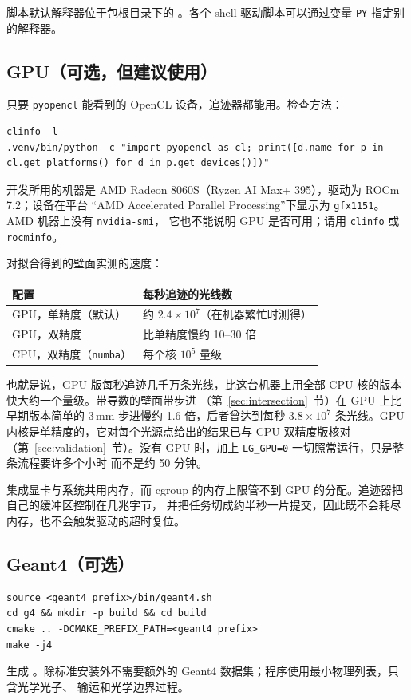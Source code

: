 \documentclass[11pt,a4paper,fontset=fandol]{ctexart}
\newcommand{\code}[1]{\texttt{#1}}
\begin{document}
脚本默认解释器位于包根目录下的 。各个 shell 驱动脚本可以通过变量 \code{PY}
指定别的解释器。

\subsection{GPU（可选，但建议使用）}

只要 \code{pyopencl} 能看到的 OpenCL 设备，追迹器都能用。检查方法：
\begin{lstlisting}
clinfo -l
.venv/bin/python -c "import pyopencl as cl; print([d.name for p in cl.get_platforms() for d in p.get_devices()])"
\end{lstlisting}
开发所用的机器是 AMD Radeon 8060S（Ryzen AI Max+ 395），驱动为 ROCm 7.2；设备在平台
“AMD Accelerated Parallel Processing”下显示为 \code{gfx1151}。AMD 机器上没有 \code{nvidia-smi}，
它也不能说明 GPU 是否可用；请用 \code{clinfo} 或 \code{rocminfo}。

对拟合得到的壁面实测的速度：

\begin{tabularx}{\textwidth}{@{}L{6.2cm}Y@{}}
\toprule
配置 & 每秒追迹的光线数 \\
\midrule
GPU，单精度（默认） & 约 $2.4\times10^{7}$（在机器繁忙时测得） \\
GPU，双精度 & 比单精度慢约 10--30 倍 \\
CPU，双精度（\code{numba}） & 每个核 $10^{5}$ 量级 \\
\bottomrule
\end{tabularx}

也就是说，GPU 版每秒追迹几千万条光线，比这台机器上用全部 CPU 核的版本快大约一个量级。带导数的壁面带步进
（第~\ref{sec:intersection}~节）在 GPU 上比早期版本简单的 3\,mm 步进慢约 1.6 倍，后者曾达到每秒
$3.8\times10^{7}$ 条光线。GPU 内核是单精度的，它对每个光源点给出的结果已与 CPU 双精度版核对
（第~\ref{sec:validation}~节）。没有 GPU 时，加上 \code{LG\_GPU=0} 一切照常运行，只是整条流程要许多个小时
而不是约 50 分钟。

集成显卡与系统共用内存，而 cgroup 的内存上限管不到 GPU 的分配。追迹器把自己的缓冲区控制在几兆字节，
并把任务切成约半秒一片提交，因此既不会耗尽内存，也不会触发驱动的超时复位。

\subsection{Geant4（可选）}

\begin{lstlisting}
source <geant4 prefix>/bin/geant4.sh
cd g4 && mkdir -p build && cd build
cmake .. -DCMAKE_PREFIX_PATH=<geant4 prefix>
make -j4
\end{lstlisting}
生成 。除标准安装外不需要额外的 Geant4 数据集；程序使用最小物理列表，只含光学光子、
输运和光学边界过程。
\end{document}
